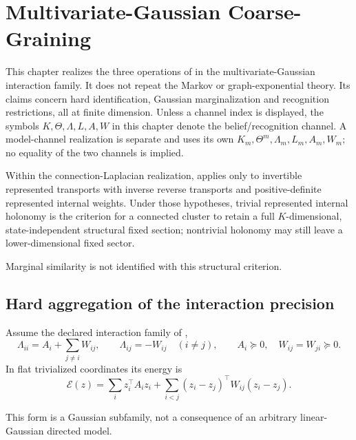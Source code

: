 \chapter{Multivariate-Gaussian Coarse-Graining}
\label{ch:gaussian-coarsegraining}

This chapter realizes the three operations of
 in the multivariate-Gaussian interaction family. It
does not repeat the Markov or graph-exponential theory. Its claims concern
hard identification, Gaussian marginalization and recognition restrictions,
all at finite dimension. Unless a channel index is displayed, the symbols
\(K,\Theta,\Lambda,L,A,W\) in this chapter denote the belief/recognition
channel. A model-channel realization is separate and uses its own
\(K_m,\Theta^m,\Lambda_m,L_m,A_m,W_m\); no equality of the two channels is
implied. 

Within the connection-Laplacian realization,
 applies only to invertible represented
transports with inverse reverse transports and positive-definite represented
internal weights. Under those hypotheses, trivial represented internal
holonomy is the criterion for a connected cluster to retain a full
\(K\)-dimensional, state-independent structural fixed section; nontrivial
holonomy may still leave a lower-dimensional fixed sector.

Marginal similarity is not identified with this structural criterion.

\section{Hard aggregation of the interaction precision}
\label{sec:cg-gaussian-aggregation}

Assume the declared interaction family of ,
\begin{equation}
\Lambda_{ii}=A_i+\sum_{j\neq i}W_{ij},\qquad
\Lambda_{ij}=-W_{ij}\quad(i\neq j),
\qquad
A_i\succeq0,\quad W_{ij}=W_{ji}\succeq0.
\label{eq:cg-interaction-family}
\end{equation}
In flat trivialized coordinates its energy is
\begin{equation}
\mathcal E(z)
=\sum_i z_i^\top A_i z_i
+\sum_{i<j}(z_i-z_j)^\top W_{ij}(z_i-z_j).
\label{eq:cg-trivialized-energy}
\end{equation}

This form is a Gaussian subfamily, not a consequence of an arbitrary
linear-Gaussian directed model. 

